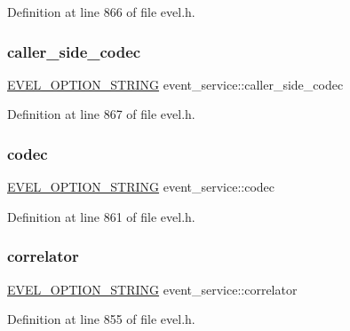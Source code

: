 Definition at line 866 of file evel.\+h.

\hypertarget{structevent__service_a0af781f10c9899163f8cd0b497cde82b}{}\label{structevent__service_a0af781f10c9899163f8cd0b497cde82b} 
\subsubsection{\texorpdfstring{caller\+\_\+side\+\_\+codec}{caller\_side\_codec}}
{\footnotesize\ttfamily \hyperlink{evel_8h_a0de5113a7b72de93c0c7b644f7ea7ec3}{E\+V\+E\+L\+\_\+\+O\+P\+T\+I\+O\+N\+\_\+\+S\+T\+R\+I\+NG} event\+\_\+service\+::caller\+\_\+side\+\_\+codec}



Definition at line 867 of file evel.\+h.

\hypertarget{structevent__service_a123a9d7e97fd49b1c5438cbdf2b95e09}{}\label{structevent__service_a123a9d7e97fd49b1c5438cbdf2b95e09} 
\subsubsection{\texorpdfstring{codec}{codec}}
{\footnotesize\ttfamily \hyperlink{evel_8h_a0de5113a7b72de93c0c7b644f7ea7ec3}{E\+V\+E\+L\+\_\+\+O\+P\+T\+I\+O\+N\+\_\+\+S\+T\+R\+I\+NG} event\+\_\+service\+::codec}



Definition at line 861 of file evel.\+h.

\hypertarget{structevent__service_a662010334edc7ec24f65048d83a80f30}{}\label{structevent__service_a662010334edc7ec24f65048d83a80f30} 
\subsubsection{\texorpdfstring{correlator}{correlator}}
{\footnotesize\ttfamily \hyperlink{evel_8h_a0de5113a7b72de93c0c7b644f7ea7ec3}{E\+V\+E\+L\+\_\+\+O\+P\+T\+I\+O\+N\+\_\+\+S\+T\+R\+I\+NG} event\+\_\+service\+::correlator}



Definition at line 855 of file evel.\+h.

